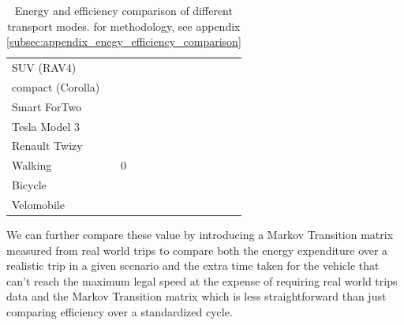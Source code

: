 \begin{table}[h!]
    \centering
    \renewcommand{\arraystretch}{1.2}
    \setlength{\tabcolsep}{3pt}

    \begin{tabular}{l S[table-format=4.0] S[table-format=4.0] S[table-format=4.1] S[table-format=1.2] S[table-format=1.2] S[table-format=1.3] S[table-format=1.2] S[table-format=1.2] S[table-format=1.2] S[table-format=1.2]}
        \toprule
        &  
        &  
        &  
        &  
        &  
        &  
        &  \\
        \midrule
        SUV (RAV4)        & & & & & & & \\
        compact (Corolla) & & & & & & & \\
        Smart ForTwo      & & & & & & & \\
        Tesla Model 3     & & & & & & & \\
        Renault Twizy     & & & & & & & \\
        Walking           & 0 & & & & & & \\
        Bicycle           & & & & & & & \\
        Velomobile        & & & & & & & \\
        \bottomrule
    \end{tabular}

    \caption{Energy and efficiency comparison of different transport modes. for methodology, see appendix \ref{subsec:appendix_enegy_efficiency_comparison}}
    \label{tab:comparison}
\end{table}


We can further compare these value by introducing a Markov Transition matrix measured from real world trips to compare both the energy expenditure over a realistic trip in a given scenario and the extra time taken for the vehicle that can't reach the maximum legal speed at the expense of requiring real world trips data and the Markov Transition matrix which is less straightforward than just comparing efficiency over a standardized cycle.
